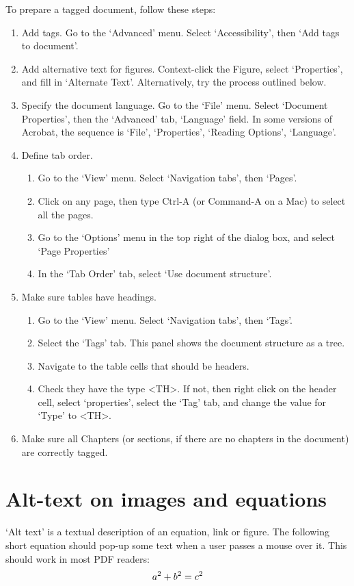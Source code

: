 \documentclass[12pt,letterpaper]{report}
\begin{document}
To prepare a tagged document, follow these steps:
\begin{enumerate}
\item Add tags. Go to the `Advanced' menu. Select `Accessibility', then `Add tags to document'.
\item Add alternative text for figures. Context-click the Figure, select `Properties', and fill in `Alternate Text'. Alternatively, try the process outlined below.
\item Specify the document language. Go to the `File' menu. Select `Document Properties', then the `Advanced' tab, `Language' field. In some versions of Acrobat, the sequence is `File', `Properties', `Reading Options', `Language'.
\item Define tab order.
\begin{enumerate}
\item Go to the `View' menu. Select `Navigation tabs', then `Pages'.
\item Click on any page, then type Ctrl-A (or Command-A on a Mac) to select all the pages.
\item Go to the `Options' menu in the top right of the dialog box, and select `Page Properties'
\item In the `Tab Order' tab, select `Use document structure'.
\end{enumerate}
\item Make sure tables have headings. 
\begin{enumerate}
\item Go to the `View' menu. Select `Navigation tabs', then `Tags'.
\item Select the `Tags' tab. This panel shows the document structure as a tree.
\item Navigate to the table cells that should be headers.
\item Check they have the type <TH>. If not, then right click on the header cell, select `properties', select the `Tag' tab, and change the value for `Type' to <TH>.
\end{enumerate}
\item Make sure all Chapters (or sections, if there are no chapters in the document) are correctly tagged.
\end{enumerate}

\section{Alt-text on images and equations\label{sec:PDFalttext}}
`Alt text' is a textual description of an equation, link or figure. The following short equation should pop-up some text when a user passes a mouse over it. This should work in most PDF readers:
\begin{equation}
\pdftooltip{a^2+b^2=c^2}{An equation}
\end{equation}
\end{document}
